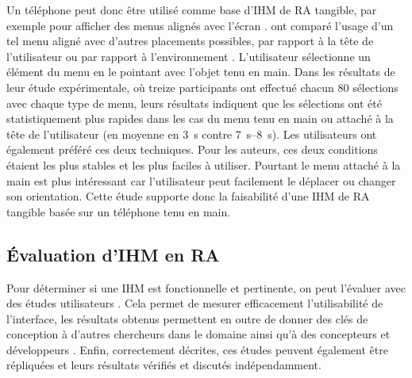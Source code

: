 
Un téléphone peut donc être utilisé comme base d'IHM de RA tangible, par exemple pour afficher des menus alignés avec l'écran . \cite{White2009} ont comparé l'usage d'un tel menu aligné avec d'autres placements possibles, par rapport à la tête de l'utilisateur ou par rapport à l'environnement . L'utilisateur sélectionne un élément du menu en le pointant avec l'objet tenu en main. Dans les résultats de leur étude expérimentale, où treize participants ont effectué chacun 80 sélections avec chaque type de menu, leurs résultats indiquent que les sélections ont été statistiquement plus rapides dans les cas du menu tenu en main ou attaché à la tête de l'utilisateur (en moyenne en \SI{3}{\s} contre \SIrange{7}{8}{\s}). Les utilisateurs ont également préféré ces deux techniques. Pour les auteurs, ces deux conditions étaient les plus stables et les plus faciles à utiliser. Pourtant le menu attaché à la main est plus intéressant car l'utilisateur peut facilement le déplacer ou changer son orientation. Cette étude supporte donc la faisabilité d'une IHM de RA tangible basée sur un téléphone tenu en main.

\subsection{Évaluation d'IHM en RA}
\label{subsec:litterature_ar_hci_evaluation}

Pour déterminer si une IHM est fonctionnelle et pertinente, on peut l'évaluer avec des études utilisateurs \citep{Billinghurst2015}. Cela permet de mesurer efficacement l'utilisabilité de l'interface, les résultats obtenus permettent en outre de donner des clés de conception à d'autres chercheurs dans le domaine ainsi qu'à des concepteurs et développeurs \citep{Jankowski2015}. Enfin, correctement décrites, ces études peuvent également être répliquées et leurs résultats vérifiés et discutés indépendamment.

